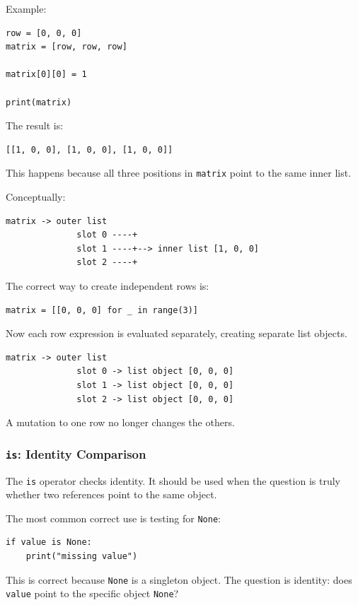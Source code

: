 Example:

\begin{verbatim}
row = [0, 0, 0]
matrix = [row, row, row]

matrix[0][0] = 1

print(matrix)
\end{verbatim}

The result is:

\begin{verbatim}
[[1, 0, 0], [1, 0, 0], [1, 0, 0]]
\end{verbatim}

This happens because all three positions in \texttt{matrix} point to the same inner list.

Conceptually:

\begin{verbatim}
matrix -> outer list
              slot 0 ----+
              slot 1 ----+--> inner list [1, 0, 0]
              slot 2 ----+
\end{verbatim}

The correct way to create independent rows is:

\begin{verbatim}
matrix = [[0, 0, 0] for _ in range(3)]
\end{verbatim}

Now each row expression is evaluated separately, creating separate list objects.

\begin{verbatim}
matrix -> outer list
              slot 0 -> list object [0, 0, 0]
              slot 1 -> list object [0, 0, 0]
              slot 2 -> list object [0, 0, 0]
\end{verbatim}

A mutation to one row no longer changes the others.

\subsubsection*{\texttt{is}: Identity Comparison}

The \texttt{is} operator checks identity. It should be used when the question is truly whether two references point to the same object.

The most common correct use is testing for \texttt{None}:

\begin{verbatim}
if value is None:
    print("missing value")
\end{verbatim}

This is correct because \texttt{None} is a singleton object. The question is identity: does \texttt{value} point to the specific object \texttt{None}?

